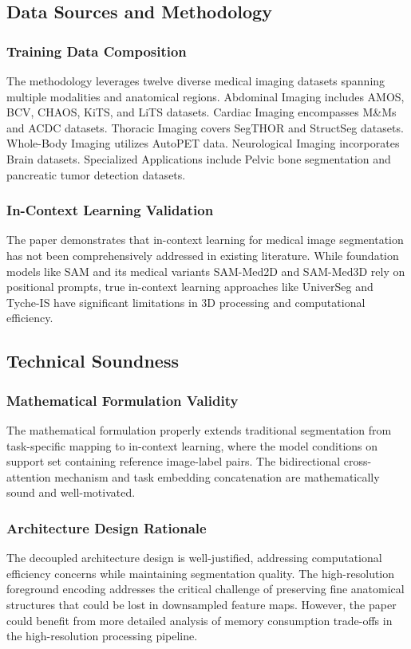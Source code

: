 \subsection{Data Sources and Methodology}
\subsubsection{Training Data Composition}
The methodology leverages twelve diverse medical imaging datasets spanning multiple modalities and anatomical regions. Abdominal Imaging includes AMOS, BCV, CHAOS, KiTS, and LiTS datasets. Cardiac Imaging encompasses M\&Ms and ACDC datasets. Thoracic Imaging covers SegTHOR and StructSeg datasets. Whole-Body Imaging utilizes AutoPET data. Neurological Imaging incorporates Brain datasets. Specialized Applications include Pelvic bone segmentation and pancreatic tumor detection datasets.

\subsubsection{In-Context Learning Validation}
The paper demonstrates that in-context learning for medical image segmentation has not been comprehensively addressed in existing literature. While foundation models like SAM and its medical variants SAM-Med2D and SAM-Med3D rely on positional prompts, true in-context learning approaches like UniverSeg and Tyche-IS have significant limitations in 3D processing and computational efficiency.

\subsection{Technical Soundness}
\subsubsection{Mathematical Formulation Validity}
The mathematical formulation properly extends traditional segmentation from task-specific mapping to in-context learning, where the model conditions on support set containing reference image-label pairs. The bidirectional cross-attention mechanism and task embedding concatenation are mathematically sound and well-motivated.

\subsubsection{Architecture Design Rationale}
The decoupled architecture design is well-justified, addressing computational efficiency concerns while maintaining segmentation quality. The high-resolution foreground encoding addresses the critical challenge of preserving fine anatomical structures that could be lost in downsampled feature maps. However, the paper could benefit from more detailed analysis of memory consumption trade-offs in the high-resolution processing pipeline.

